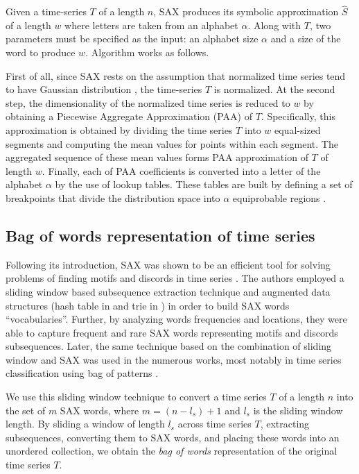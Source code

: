 \documentclass{llncs}
\begin{document}
Given a time-series $T$ of a length $n$, SAX produces its symbolic approximation $\hat{S}$ of 
a length $w$ where letters are taken from an alphabet $\alpha$. 
Along with $T$, two parameters must be specified as the input: an alphabet size $\alpha$ and 
a size of the word to produce $w$. Algorithm works as follows. 

First of all, since SAX rests on the assumption that normalized time series tend to have Gaussian 
distribution \cite{larsen_marx}, the time-series $T$ is normalized. 
At the second step, the dimensionality of the normalized time series is reduced to $w$ by 
obtaining a Piecewise Aggregate Approximation (PAA) of $T$. 
Specifically, this approximation is obtained by dividing the time series $T$ into $w$ 
equal-sized segments and computing the mean values for points within each segment. 
The aggregated sequence of these mean values forms PAA approximation of $T$ of length $w$.
Finally, each of PAA coefficients is converted into a letter of the alphabet $\alpha$ by the use 
of lookup tables. These tables are built by defining a set of breakpoints that divide the 
distribution space into $\alpha$ equiprobable regions \cite{sax}.

\subsection{Bag of words representation of time series} \label{bow_representation}
Following its introduction, SAX was shown to be an efficient tool for solving problems 
of finding motifs and discords in time series \cite{motifs} \cite{hot_sax}. 
The authors employed a sliding window based subsequence extraction technique 
and augmented data structures (hash table in \cite{motifs} and trie in \cite{hot_sax}) 
in order to build SAX words ``vocabularies''. Further, by analyzing words frequencies 
and locations, they were able to capture frequent and rare SAX words representing 
motifs and discords subsequences. Later, the same technique based on the combination 
of sliding window and SAX was used in the numerous works, most notably in time series 
classification using bag of patterns \cite{bag_patterns}. 

We use this sliding window technique to convert a time series $T$ of a length $n$ into 
the set of $m$ SAX words, where $m=(n-l_{s})+1$ and $l_{s}$ is the sliding window length. 
By sliding a window of length $l_{s}$ across time series $T$, extracting subsequences, 
converting them to SAX words, and placing these words into an unordered collection, 
we obtain the \textit{bag of words} representation of the original time series $T$.
\end{document}
